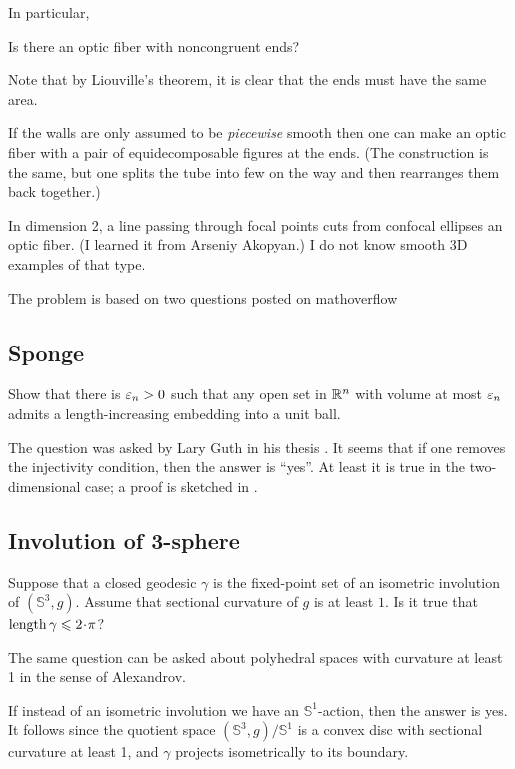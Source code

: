 In particular, 

\begin{pr}
Is there an optic fiber with noncongruent ends?
\end{pr}

Note that by  Liouville's theorem, it is clear that the ends must have the same area.

If the walls are only assumed to be \emph{piecewise} smooth then one can make an optic fiber with a pair of equidecomposable figures at the ends.
(The construction is the same, but one splits the tube into few on the way and then rearranges them back together.) 

In dimension 2, a line passing through focal points cuts from confocal ellipses an optic fiber. (I learned it from Arseniy Akopyan.)  I do not know smooth 3D examples of that type.

The problem is based on two questions posted on mathoverflow \cite{rourke-optic, petrunin-optic}

\subsection*{Sponge}

\begin{pr}
Show that there is $\varepsilon_n>0$ such that any open set in $\mathbb{R}^n$ with volume at most $\varepsilon_n$ admits a length-increasing embedding into a unit ball.
\end{pr}

The question was asked by Lary Guth in his thesis \cite{guth-2005}.
It seems that if one removes the injectivity condition, then the answer is ``yes''.
At least it is true in the two-dimensional case; a proof is sketched in \cite{petrunin-guth}.

\subsection*{Involution of 3-sphere}

\begin{pr}
Suppose that a closed geodesic $\gamma$ is the fixed-point set of an isometric involution of $(\mathbb{S}^3,g)$.
Assume that sectional curvature of $g$ is at least $1$.
Is it true that $\length\gamma\le2\cdot\pi$?
\end{pr}

The same question can be asked about polyhedral spaces with curvature at least 1 in the sense of Alexandrov.

If instead of an isometric involution we have an $\mathbb{S}^1$-action, then the answer is yes.
It follows since the quotient space $(\mathbb{S}^3,g)/\mathbb{S}^1$ is a convex disc with sectional curvature at least 1,
and $\gamma$ projects isometrically to its boundary.

